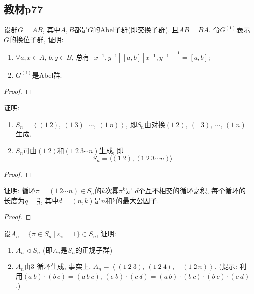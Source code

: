 \subsection{教材p77}

\begin{problem}
    设群$G = AB$, 其中$A, B$都是$G$的Abel子群(即交换子群),
且$AB = BA$. 令$G^{(1)}$表示$G$的换位子群, 证明: 
\begin{enumerate}[(1)]
    \item $\forall a, x \in A$, $b, y \in B$,
总有$[x^{-1}, y^{-1}][a, b][x^{-1}, y^{-1}]^{-1} = [a, b]$;
    \item $G^{(1)}$是Abel群.
\end{enumerate}
\end{problem}

\begin{proof}
    
\end{proof}

\begin{problem}
    证明: 
\begin{enumerate}[(1)]
    \item $S_{n} = \left\langle (1\:2),\: (1\:3),\: \cdots,\: (1\:n) \right\rangle$,
即$S_n$由对换$(1\:2),\: (1\:3),\: \cdots,\: (1\:n)$生成;
    \item $S_{n}$可由$(1\:2)$和$(1\:2\:3 \cdots n)$生成, 即
\[
    S_n = \big\langle (1\:2),(1\:2\:3 \cdots n) \big\rangle.
\]
\end{enumerate}
\end{problem}

\begin{proof}
    
\end{proof}

\begin{problem}
    证明: 循环$\pi = (1\:2 \cdots n) \in S_n$的$k$次幂$\pi^k$是
$d$个互不相交的循环之积, 每个循环的长度为$q = \frac nd$,
其中$d = (n, k)$是$n$和$k$的最大公因子.
\end{problem}

\begin{proof}
    
\end{proof}

\begin{problem}
    设$A_n= \{\pi \in S_n \mid \varepsilon_\pi = 1\} \subset S_n$,
证明: 
\begin{enumerate}[(1)]
    \item $A_n \lhd S_n$ (即$A_n$是$S_n$的正规子群);
    \item $A_n$由$3$-循环生成, 事实上, $A_n = \left\langle (1\:2\:3),\: (1\:2\:4),\: \cdots (1\:2\:n) \right\rangle$.
(提示: 利用$(a\:b) \cdot (b\:c) = (a\:b\:c),\, (a\:b) \cdot (c\:d) = (a\:b) \cdot (b\:c) \cdot (b\:c) \cdot (c\:d)$.)
\end{enumerate}
\end{problem}

